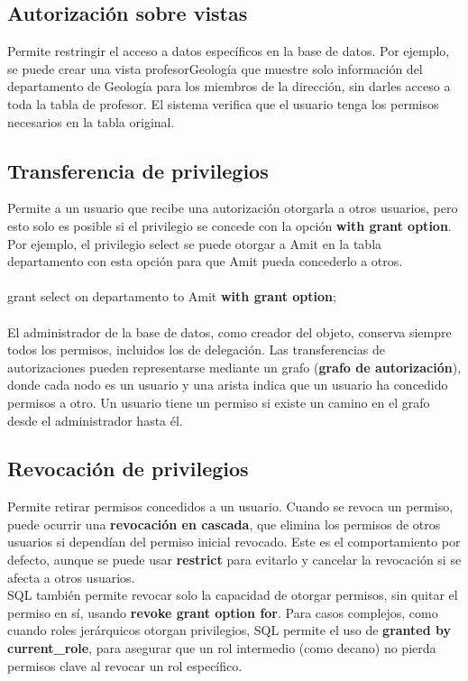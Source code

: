 \documentclass{article}
\begin{document}
\subsection{Autorización sobre vistas}
Permite restringir el acceso a datos específicos en la base de datos. Por ejemplo, se puede crear una vista profesorGeología que muestre solo información del departamento de Geología para los miembros de la dirección, sin darles acceso a toda la tabla de profesor. El sistema verifica que el usuario tenga los permisos necesarios en la tabla original. \\

\subsection{Transferencia de privilegios}
Permite a un usuario que recibe una autorización otorgarla a otros usuarios, pero esto solo es posible si el privilegio se concede con la opción \textbf{with grant option}. Por ejemplo, el privilegio select se puede otorgar a Amit en la tabla departamento con esta opción para que Amit pueda concederlo a otros. \\ 
\\
grant select on departamento to Amit \textbf{with grant option}; \\
\\
El administrador de la base de datos, como creador del objeto, conserva siempre todos los permisos, incluidos los de delegación. Las transferencias de autorizaciones pueden representarse mediante un grafo (\textbf{grafo de autorización}), donde cada nodo es un usuario y una arista indica que un usuario ha concedido permisos a otro. Un usuario tiene un permiso si existe un camino en el grafo desde el administrador hasta él.

\subsection{Revocación de privilegios}
Permite retirar permisos concedidos a un usuario. Cuando se revoca un permiso, puede ocurrir una \textbf{revocación en cascada}, que elimina los permisos de otros usuarios si dependían del permiso inicial revocado. Este es el comportamiento por defecto, aunque se puede usar \textbf{restrict} para evitarlo y cancelar la revocación si se afecta a otros usuarios. \\

SQL también permite revocar solo la capacidad de otorgar permisos, sin quitar el permiso en sí, usando \textbf{revoke grant option for}. Para casos complejos, como cuando roles jerárquicos otorgan privilegios, SQL permite el uso de \textbf{granted by current\_role}, para asegurar que un rol intermedio (como decano) no pierda permisos clave al revocar un rol específico.
\end{document}
